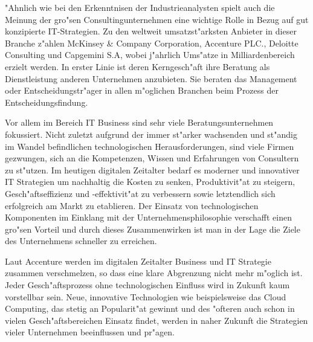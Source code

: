 "Ahnlich wie bei den Erkenntnisen der Industrieanalysten spielt auch die Meinung der gro"sen Consultingunternehmen eine wichtige Rolle in Bezug auf gut konzipierte IT-Strategien. Zu den weltweit umsatzst"arksten Anbieter in dieser Branche z"ahlen McKinsey \& Company Corporation, Accenture PLC., Deloitte Consulting und Capgemini S.A, wobei j"ahrlich Ums"atze in Milliardenbereich erzielt werden. In erster Linie ist deren Kerngesch"aft ihre Beratung als Dienstleistung anderen Unternehmen anzubieten. Sie beraten das Management oder Entscheidungstr"ager in allen m"oglichen Branchen beim Prozess der Entscheidungsfindung.

Vor allem im Bereich IT Business sind sehr viele Beratungsunternehmen fokussiert. Nicht zuletzt aufgrund der immer st"arker wachsenden und st"andig im Wandel befindlichen technologischen Herausforderungen, sind viele Firmen gezwungen, sich an die Kompetenzen, Wissen und Erfahrungen von Consultern zu st"utzen. Im heutigen digitalen Zeitalter bedarf es moderner und innovativer IT Strategien um nachhaltig die Kosten zu senken, Produktivit"at zu steigern, Gesch"aftseffizienz und -effektivit"at zu verbessern sowie letztendlich sich erfolgreich am Markt zu etablieren. Der Einsatz von technologischen Komponenten im Einklang mit der Unternehmensphilosophie verschafft einen gro"sen Vorteil und durch dieses Zusammenwirken ist man in der Lage die Ziele des Unternehmens schneller zu erreichen. 

Laut Accenture werden im digitalen Zeitalter Business und IT Strategie zusammen verschmelzen, so dass eine klare Abgrenzung nicht mehr m"oglich ist. Jeder Gesch"aftsprozess ohne technologischen Einfluss wird in Zukunft kaum vorstellbar sein. Neue, innovative Technologien wie beispielsweise das Cloud Computing, das stetig an Popularit"at gewinnt und des "ofteren auch schon in vielen Gesch"aftsbereichen Einsatz findet, werden in naher Zukunft die Strategien vieler Unternehmen beeinflussen und pr"agen.\cite{AccentureConsulting}
